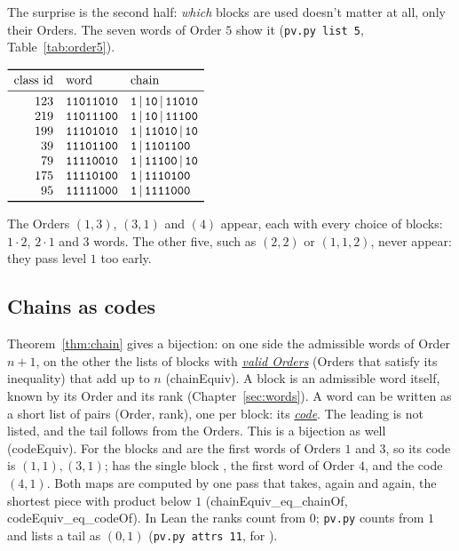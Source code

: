 \documentclass[11pt,a4paper,titlepage]{article}
\makeatletter
\newcommand{\termhere}[1]{\leavevmode
  \Hy@raisedlink{\hyper@anchorstart{term:#1}\hyper@anchorend}}
\newcommand{\keyterm}[2]{\hyperlink{box:#1}{\emph{#2}}}
\newcommand{\lean}[1]{\textsf{#1}}
\newcommand{\pv}[1]{\texttt{pv.py #1}}
\makeatother
\begin{document}
\nopagebreak
The surprise is the second half: \emph{which} blocks are used doesn't matter at
all, only their Orders. The seven words of Order $5$ show it (\pv{list 5}, Table~\ref{tab:order5}).

\begin{table}[htbp]
\centering
$\begin{array}{r l l}
\toprule
\text{class id} & \text{word} & \text{chain} \\
\midrule
123 & \bw{11011010} & \bw{1}\,|\,\bw{10}\,|\,\bw{11010} \\
219 & \bw{11011100} & \bw{1}\,|\,\bw{10}\,|\,\bw{11100} \\
199 & \bw{11101010} & \bw{1}\,|\,\bw{11010}\,|\,\bw{10} \\
39  & \bw{11101100} & \bw{1}\,|\,\bw{1101100} \\
79  & \bw{11110010} & \bw{1}\,|\,\bw{11100}\,|\,\bw{10} \\
175 & \bw{11110100} & \bw{1}\,|\,\bw{1110100} \\
95  & \bw{11111000} & \bw{1}\,|\,\bw{1111000} \\
\bottomrule
\end{array}$
\caption{The seven admissible words of Order $5$ and their chains.}
\label{tab:order5}
\end{table}

The Orders $(1,3)$, $(3,1)$ and $(4)$ appear, each with every choice of blocks:
$1\cdot 2$, $2 \cdot 1$ and $3$ words. The other five, such as $(2,2)$ or $(1,1,2)$,
never appear: they pass level $1$ too early.

\subsection*{Chains as codes}

\termhere{validorders}Theorem~\ref{thm:chain} gives a bijection: on one side the admissible words of Order
$n+1$, on the other the lists of blocks with \keyterm{validorders}{valid Orders} (Orders that satisfy its
inequality) that add up to $n$
(\lean{chainEquiv}). \termhere{code}A block is an admissible word itself, known by its Order and
its rank (Chapter~\ref{sec:words}). A word can be written as a short list of
pairs (Order, rank), one per block: its \keyterm{code}{code}. The leading  is not
listed, and the tail follows from the Orders. This is a bijection as well
(\lean{codeEquiv}). For  the blocks  and  are the
first words of Orders $1$ and $3$, so its code is $(1,1), (3,1)$; 
has the single block , the first word of Order $4$, and the code
$(4,1)$. Both maps are computed by one pass that takes, again and again, the
shortest piece with product below $1$ (\lean{chainEquiv\_eq\_chainOf},
\lean{codeEquiv\_eq\_codeOf}). In Lean the ranks count from $0$;
\texttt{pv.py} counts from $1$ and lists a tail as $(0,1)$ (\pv{attrs 11}, for ).
\end{document}
